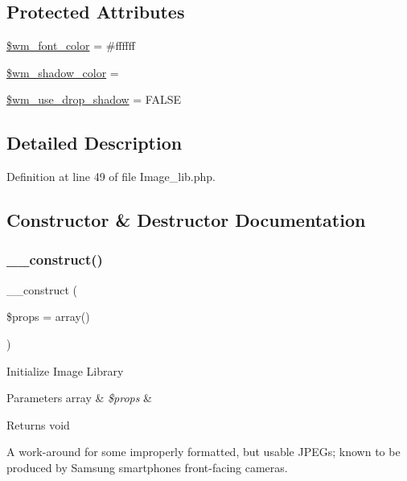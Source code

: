 \subsection*{Protected Attributes}
\begin{DoxyCompactItemize}
\item 
\mbox{\hyperlink{class_c_i___image__lib_ae9498442637ff2466d4426af45f68c6b}{\$wm\+\_\+font\+\_\+color}} = \textquotesingle{}\#ffffff\textquotesingle{}
\item 
\mbox{\hyperlink{class_c_i___image__lib_aca292b49514fe3238440675c4b2642ca}{\$wm\+\_\+shadow\+\_\+color}} = \textquotesingle{}\textquotesingle{}
\item 
\mbox{\hyperlink{class_c_i___image__lib_a49b77ed476cebe5f357705e7a9c4ccce}{\$wm\+\_\+use\+\_\+drop\+\_\+shadow}} = F\+A\+L\+SE
\end{DoxyCompactItemize}


\subsection{Detailed Description}


Definition at line 49 of file Image\+\_\+lib.\+php.



\subsection{Constructor \& Destructor Documentation}
\mbox{\label{class_c_i___image__lib_a563262d396a1cef6153c9998d77bb548}} 
\subsubsection{\texorpdfstring{\_\_construct()}{\_\_construct()}}
{\footnotesize\ttfamily \+\_\+\+\_\+construct (\begin{DoxyParamCaption}\item[{}]{\$props = {\ttfamily array()} }\end{DoxyParamCaption})}

Initialize Image Library


\begin{DoxyParams}[1]{Parameters}
array & {\em \$props} & \\
\hline
\end{DoxyParams}
\begin{DoxyReturn}{Returns}
void 
\end{DoxyReturn}
A work-\/around for some improperly formatted, but usable J\+P\+E\+Gs; known to be produced by Samsung smartphones\textquotesingle{} front-\/facing cameras.


